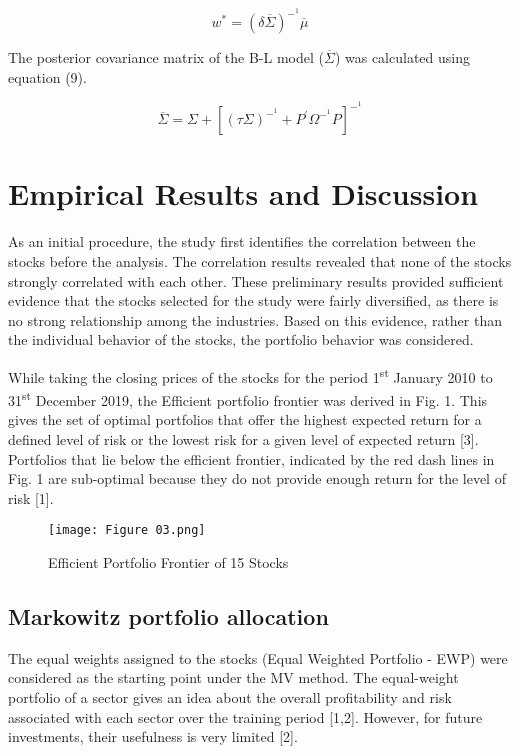 \documentclass[conference]{IEEEtran}
\begin{document}
\begin{equation}
w^* = (\delta\overline{\Sigma})^-^1 \overline{\mu}
\end{equation} 

The posterior covariance matrix of the B-L model ($\overline{\Sigma}$) was calculated using equation (9).

\begin{equation}
\overline{\Sigma} = \Sigma + [(\tau\Sigma)^-^1 + P^{'}\Omega^-^1P]^-^1
\end{equation} 

\section{Empirical Results and Discussion}
As an initial procedure, the study first identifies the correlation between the stocks before the analysis. The correlation results revealed that none of the stocks strongly correlated with each other. These preliminary results provided sufficient evidence that the stocks selected for the study were fairly diversified, as there is no strong relationship among the industries. Based on this evidence, rather than the individual behavior of the stocks, the portfolio behavior was considered.

While taking the closing prices of the stocks for the period 1\textsuperscript{st} January 2010 to 31\textsuperscript{st} December 2019, the Efficient portfolio frontier was derived in Fig. 1. This gives the set of optimal portfolios that offer the highest expected return for a defined level of risk or the lowest risk for a given level of expected return [3]. Portfolios that lie below the efficient frontier, indicated by the red dash lines in Fig. 1 are sub-optimal because they do not provide enough return for the level of risk [1].

\begin{figure}[H]
\centerline{\texttt{[image: Figure 03.png]}}
\caption{Efficient Portfolio Frontier of 15 Stocks}
\label{fig}
\end{figure}

\subsection{Markowitz portfolio allocation}
The equal weights assigned to the stocks (Equal Weighted Portfolio - EWP) were considered as the starting point under the MV method. The equal-weight portfolio of a sector gives an idea about the overall profitability and risk associated with each sector over the training period [1,2]. However, for future investments, their usefulness is very limited [2].
\end{document}

